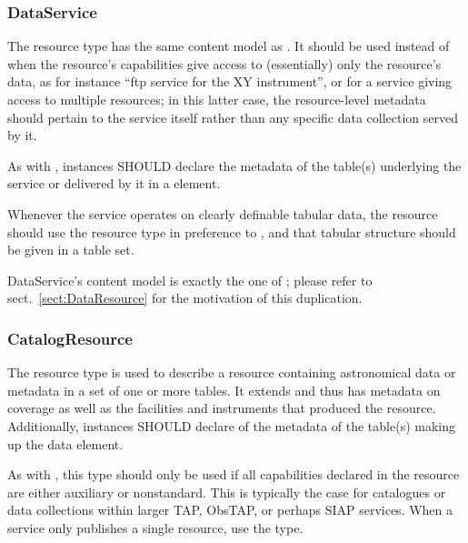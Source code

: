 \documentclass[11pt,a4paper]{ivoa}
\begin{document}

\subsubsection{DataService}

The  resource type has the same content model as
.  It should be used instead of
 when the resource's capabilities give
access to (essentially) only the resource's data, as for instance
``ftp service for the XY instrument'', or for a service giving access
to multiple resources; in this latter case, the resource-level
metadata should pertain to the service itself rather than any specific
data collection served by it.

As with , instances SHOULD
declare the metadata of the table(s) underlying the service or
delivered by it in a  element.

Whenever the service operates on clearly definable tabular
data, the resource should use the  resource type
in preference to , and that tabular structure
should be given in a table set.

DataService's content model is exactly the one of
; please refer to sect.~\ref{sect:DataResource}
for the motivation of this duplication.




\subsubsection{CatalogResource}
\label{sect:CatalogResource}


The  resource type is used to describe a
resource containing astronomical data or metadata in a set of one or
more tables.  It extends  and thus has metadata
on coverage as well as the facilities and instruments that produced the
resource.  Additionally,  instances SHOULD
declare of the metadata of the table(s) making up the data
 element.

As with , this type should only be used if all
capabilities declared in the resource are either auxiliary or
nonstandard.  This is typically the case for catalogues or data
collections within larger TAP, ObsTAP, or perhaps SIAP services.  When
a service only publishes a single resource, use the
 type.
\end{document}
